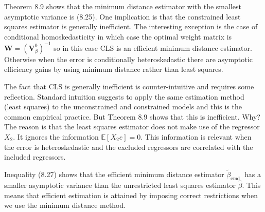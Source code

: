 \documentclass[10pt]{article}
\begin{document}
Theorem $8.9$ shows that the minimum distance estimator with the smallest asymptotic variance is (8.25). One implication is that the constrained least squares estimator is generally inefficient. The interesting exception is the case of conditional homoskedasticity in which case the optimal weight matrix is $\boldsymbol{W}=\left(\boldsymbol{V}_{\beta}^{0}\right)^{-1}$ so in this case CLS is an efficient minimum distance estimator. Otherwise when the error is conditionally heteroskedastic there are asymptotic efficiency gains by using minimum distance rather than least squares.

The fact that CLS is generally inefficient is counter-intuitive and requires some reflection. Standard intuition suggests to apply the same estimation method (least squares) to the unconstrained and constrained models and this is the common empirical practice. But Theorem $8.9$ shows that this is inefficient. Why? The reason is that the least squares estimator does not make use of the regressor $X_{2}$. It ignores the information $\mathbb{E}\left[X_{2} e\right]=0$. This information is relevant when the error is heteroskedastic and the excluded regressors are correlated with the included regressors.

Inequality (8.27) shows that the efficient minimum distance estimator $\widetilde{\beta}_{\text {emd }}$ has a smaller asymptotic variance than the unrestricted least squares estimator $\widehat{\beta}$. This means that efficient estimation is attained by imposing correct restrictions when we use the minimum distance method.
\end{document}

